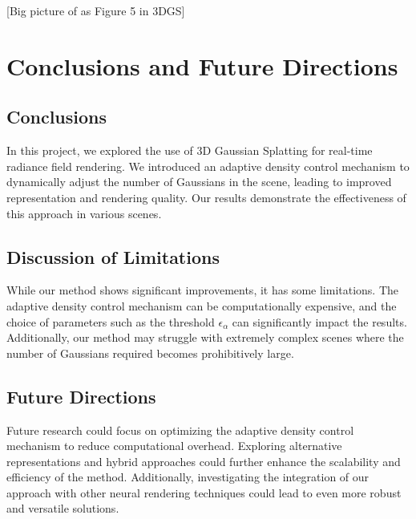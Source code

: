 \documentclass[11pt]{report}
\begin{document}
[Big picture of as Figure 5 in 3DGS]





\chapter{Conclusions and Future Directions}

\section{Conclusions}
In this project, we explored the use of 3D Gaussian Splatting for real-time radiance field rendering. We introduced an adaptive density control mechanism to dynamically adjust the number of Gaussians in the scene, leading to improved representation and rendering quality. Our results demonstrate the effectiveness of this approach in various scenes.

\section{Discussion of Limitations}
While our method shows significant improvements, it has some limitations. The adaptive density control mechanism can be computationally expensive, and the choice of parameters such as the threshold $\epsilon_\alpha$ can significantly impact the results. Additionally, our method may struggle with extremely complex scenes where the number of Gaussians required becomes prohibitively large.

\section{Future Directions}
Future research could focus on optimizing the adaptive density control mechanism to reduce computational overhead. Exploring alternative representations and hybrid approaches could further enhance the scalability and efficiency of the method. Additionally, investigating the integration of our approach with other neural rendering techniques could lead to even more robust and versatile solutions.
\end{document}
